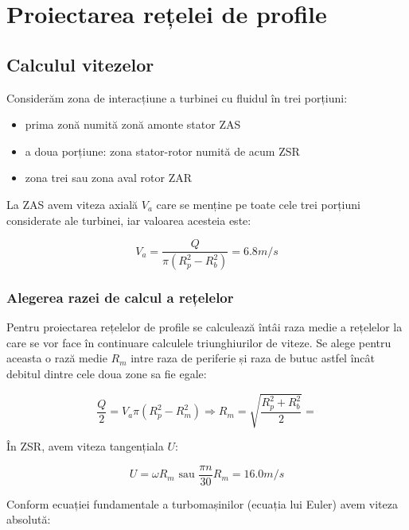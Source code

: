 \chapter{Proiectarea rețelei de profile} \label{chapter:proiectarea}

\section{Calculul vitezelor}

Considerăm zona de interacțiune a turbinei cu fluidul în trei porțiuni:
\begin{itemize}
	\item prima zonă numită zonă amonte stator ZAS
	\item a doua porțiune: zona stator-rotor numită de acum ZSR
	\item zona trei sau zona aval rotor ZAR
\end{itemize}

La ZAS avem viteza axială $V_{a}$ care se menține pe toate cele trei porțiuni considerate ale turbinei, iar valoarea acesteia este:

\begin{equation}
V_a=\frac{Q}{\pi(R_{p}^2-R_{b}^2)}=6.8\si{m/s}
\end{equation}

\subsection{Alegerea razei de calcul a rețelelor}

Pentru proiectarea rețelelor de profile se calculează întâi raza medie a rețelelor la care se vor face în continuare calculele triunghiurilor de viteze. Se alege pentru aceasta o rază medie $R_m$ intre raza de periferie și raza de butuc astfel încât debitul dintre cele doua zone sa fie egale:

\begin{equation}
\frac{Q}{2} = V_a \pi (R_p^2 - R_m^2) \Rightarrow{} R_m = \sqrt{\frac{R_p^2 + R_b^2}{2}} = 
\end{equation}

În ZSR, avem viteza tangențiala $U$:

\begin{equation}
U=\omega R_m \text{ sau } \frac{\pi n}{30} R_m=16.0\si{m/s}
\end{equation}

Conform ecuației fundamentale a turbomașinilor (ecuația lui Euler) avem viteza absolută:

